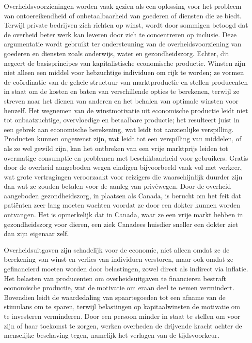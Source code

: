 Overheidsvoorzieningen worden vaak gezien als een oplossing voor het probleem van ontoereikendheid of onbetaalbaarheid van goederen of diensten die ze biedt. Terwijl private bedrijven zich richten op winst, wordt door sommigen betoogd dat de overheid beter werk kan leveren door zich te concentreren op inclusie. Deze argumentatie wordt gebruikt ter ondersteuning van de overheidsvoorziening van goederen en diensten zoals onderwijs, water en gezondheidszorg. Echter, dit negeert de basisprincipes van kapitalistische economische productie. Winsten zijn niet alleen een middel voor hebzuchtige individuen om rijk te worden; ze vormen de coördinatie van de gehele structuur van marktproductie en stellen producenten in staat om de kosten en baten van verschillende opties te berekenen, terwijl ze streven naar het dienen van anderen en het behalen van optimale winsten voor henzelf. Het wegnemen van de winstmotivatie uit economische productie leidt niet tot onbaatzuchtige, overvloedige en betaalbare productie; het resulteert juist in een gebrek aan economische berekening, wat leidt tot aanzienlijke verspilling. Producten kunnen ongewenst zijn, wat leidt tot een verspilling van middelen, of als ze wel gewild zijn, kan het ontbreken van een vrije marktprijs leiden tot overmatige consumptie en problemen met beschikbaarheid voor gebruikers. \textquotesingle Gratis\textquotesingle{} door de overheid aangeboden wegen eindigen bijvoorbeeld vaak vol met verkeer, wat grote vertragingen veroorzaakt voor reizigers die waarschijnlijk duurder zijn dan wat ze zouden betalen voor de aanleg van privéwegen. Door de overheid aangeboden gezondheidszorg, in plaatsen als Canada, is berucht om het feit dat patiënten zeer lang moeten wachten voordat ze door een dokter kunnen worden ontvangen. Het is opmerkelijk dat in Canada, waar ze een vrije markt hebben in gezondheidszorg voor dieren, een ziek Canadees huisdier sneller een dokter ziet dan zijn eigenaar zelf.\autocite{184}

Overheidsuitgaven zijn schadelijk voor de economie, niet alleen omdat ze de berekening van winst en verlies van individuen verstoren, maar ook omdat ze gefinancierd moeten worden door belastingen, zowel direct als indirect via inflatie. Het belasten van producenten om overheidsuitgaven te financieren bestraft economische productie, wat de motivatie om eraan deel te nemen vermindert. Bovendien leidt de waardedaling van spaartegoeden tot een afname van de stimulans om te sparen, terwijl belastingen op kapitaalwinsten de motivatie om te investeren verminderen. Door een persoon minder in staat te stellen om voor zijn of haar toekomst te zorgen, werken overheden de drijvende kracht achter de menselijke beschaving tegen, namelijk het verlagen van de tijdsvoorkeur.


